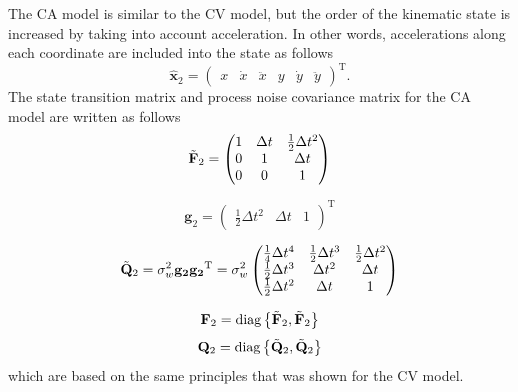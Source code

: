 \documentclass[english, 12pt, a4paper, elec, utf8, a-1b, online]{aaltothesis}
\numberwithin{equation}{section}
\renewcommand{\vec}[1]{\mathbf{#1}}
\newcommand{\transpose}[1]{#1^\text{T}}
\newcommand{\dt}{\Delta t}
\newcommand{\diag}[1]{\text{diag}\left\{ #1 \right\}}
\begin{document}
The CA model is similar to the CV model, but the order of the kinematic state is increased by taking into account acceleration.
In other words, accelerations along each coordinate are included into the state as follows  
\begin{equation}\label{eq:x_mode2}
    \hat{\mathbf{x}}_2 =
        \transpose{
        \begin{pmatrix}
            x & \dot{x} & \ddot{x} & y & \dot{y} & \ddot{y}
        \end{pmatrix}}.
\end{equation}
The state transition matrix and process noise covariance matrix for the CA model are written as follows
\begin{equation}\label{eq:f_mode2}
    \Tilde{\vec{F}}_2 = 
    \begin{pmatrix}
        1 & \dt & \frac{1}{2}\dt^2  \\ 
        0 & 1 & \dt \\
        0 & 0 & 1  \\
    \end{pmatrix}
\end{equation}

\begin{equation}
    \vec{g}_2 = \transpose{
        \begin{pmatrix}
            \frac{1}{2} \dt^2 & \dt & 1
        \end{pmatrix}
    }
\end{equation}

\begin{equation}
    \Tilde{\vec{Q}}_2 = \sigma_w^2 \vec{g_2} \transpose{\vec{g_2}}  =  \sigma_w^2
        \begin{pmatrix}
            \frac{1}{4} \dt^4 & \frac{1}{2} \dt^3 & \frac{1}{2} \dt^2 \\ 
            \frac{1}{2} \dt^3 & \dt^2 &  \dt \\
            \frac{1}{2} \dt^2 & \dt & 1
        \end{pmatrix}
\end{equation}

\begin{equation}\label{eq:F_mode2}
\vec{F}_2 = \diag{\Tilde{\vec{F}}_2, \Tilde{\vec{F}}_2}
\end{equation}
\begin{equation}
    \vec{Q}_2 = \diag{\Tilde{\vec{Q}}_2, \Tilde{\vec{Q}}_2}
\end{equation}
which are based on the same principles that was shown for the CV model.
\end{document}
